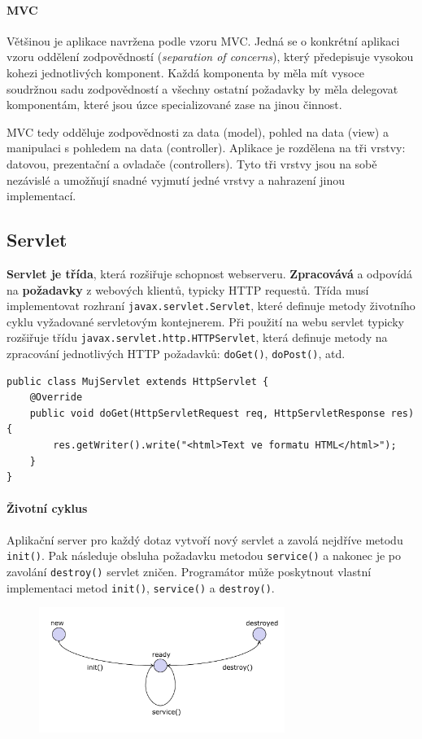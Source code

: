 \paragraph{MVC} Většinou je aplikace navržena podle vzoru MVC. Jedná se o konkrétní aplikaci vzoru oddělení zodpovědností (\textit{separation of concerns}), který předepisuje vysokou kohezi jednotlivých komponent. Každá komponenta by měla mít vysoce soudržnou sadu zodpovědností a všechny ostatní požadavky by měla delegovat komponentám, které jsou úzce specializované zase na jinou činnost.

MVC tedy odděluje zodpovědnosti za data (model), pohled na data (view) a manipulaci s pohledem na data (controller). Aplikace je rozdělena na tři vrstvy: datovou, prezentační a ovladače (controllers). Tyto tři vrstvy jsou na sobě nezávislé a umožňují snadné vyjmutí jedné vrstvy a nahrazení jinou implementací.

\subsection{Servlet}
\textbf{Servlet je třída}, která rozšiřuje schopnost webserveru. \textbf{Zpracovává} a odpovídá na \textbf{požadavky} z webových klientů, typicky HTTP requestů. Třída musí implementovat rozhraní \texttt{javax.servlet.Servlet}, které definuje metody životního cyklu vyžadované servletovým kontejnerem. Při použití na webu servlet typicky rozšiřuje třídu \texttt{javax.servlet.http.HTTPServlet}, která definuje metody na zpracování jednotlivých HTTP požadavků: \texttt{doGet()}, \texttt{doPost()}, atd.

\begin{verbatim}
public class MujServlet extends HttpServlet { 
    @Override
    public void doGet(HttpServletRequest req, HttpServletResponse res) {
        res.getWriter().write("<html>Text ve formatu HTML</html>");
    }
}
\end{verbatim}

\paragraph{Životní cyklus} Aplikační server pro každý dotaz vytvoří nový servlet a zavolá nejdříve metodu \texttt{init()}. Pak následuje obsluha požadavku metodou \texttt{service()} a nakonec je po zavolání \texttt{destroy()} servlet zničen. Programátor může poskytnout vlastní implementaci metod \texttt{init()}, \texttt{service()} a \texttt{destroy()}.


\begin{figure}[h!]
\centering
\includegraphics[width=80mm]{16/images/servlet-lifecycle}
\end{figure}

